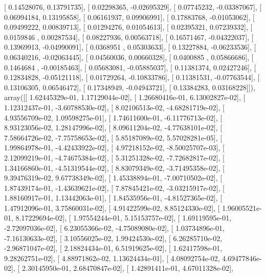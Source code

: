 \documentclass{article}
\begin{document}
       [ 0.14528076,  0.13791735],
       [ 0.02298365, -0.02695329],
       [ 0.07745232, -0.03387067],
       [ 0.06994184,  0.13195858],
       [ 0.06161937,  0.09906991],
       [ 0.17883768, -0.01053062],
       [ 0.09499222,  0.00839713],
       [ 0.01294276,  0.01054613],
       [ 0.02395321,  0.07239332],
       [ 0.0159846 ,  0.00287534],
       [ 0.08227936,  0.00563718],
       [ 0.16571467, -0.04322037],
       [ 0.13969913, -0.04990091],
       [ 0.0368951 ,  0.05303633],
       [ 0.13227884, -0.06233536],
       [ 0.06340216, -0.02063445],
       [ 0.04560036,  0.00660328],
       [ 0.0400885 ,  0.05866686],
       [ 0.1464684 , -0.00185463],
       [ 0.05683081, -0.05885037],
       [ 0.11381374,  0.02427246],
       [ 0.12834828, -0.05121118],
       [ 0.01729264, -0.10833786],
       [ 0.11381531, -0.07763544],
       [ 0.13106305,  0.06546472],
       [ 0.17348949, -0.04943721],
       [ 0.13384283,  0.03168228]]), array([[  1.62445329e-01,   1.17129044e-02],
       [  1.26680416e-01,   6.13002827e-02],
       [  1.12312437e-01,  -3.60788530e-02],
       [  8.02106513e-02,  -4.68281719e-02],
       [  4.93556709e-02,   1.09598275e-01],
       [  1.74611600e-01,  -6.11776713e-02],
       [  8.93123056e-02,   1.28147996e-02],
       [  8.09611204e-02,  -4.77638101e-02],
       [  7.58664726e-02,  -7.75758653e-02],
       [  5.85187089e-02,   5.57028281e-05],
       [  1.99864978e-01,  -4.42433922e-02],
       [  4.97218152e-02,  -8.50025707e-03],
       [  2.12099219e-01,  -4.74675384e-02],
       [  5.31251328e-02,  -7.72682817e-02],
       [  1.34166860e-01,  -4.51319544e-02],
       [  8.83079349e-02,  -3.71495358e-02],
       [  9.39476319e-02,   9.67738349e-02],
       [  1.45338894e-01,  -7.00710502e-02],
       [  1.87439174e-01,  -1.43639621e-02],
       [  7.87845421e-02,  -3.03215917e-02],
       [  1.88160917e-01,   1.13442063e-01],
       [  1.84535956e-01,  -4.81527365e-02],
       [  1.47912096e-01,   3.75860031e-02],
       [  4.91422599e-02,   8.85124330e-02],
       [  1.96005521e-01,   8.17229694e-02],
       [  1.97554244e-01,   5.15153757e-02],
       [  1.69119595e-01,  -2.72097036e-02],
       [  6.23055366e-02,  -4.75089080e-02],
       [  1.03734896e-01,  -7.16130633e-02],
       [  3.10556025e-02,   1.99424530e-02],
       [  6.26285710e-02,  -2.96871047e-02],
       [  2.18824434e-01,   6.51919625e-02],
       [  1.62417598e-01,   9.28262751e-02],
       [  4.88971862e-02,   1.13624434e-01],
       [  4.08092754e-02,   4.69477846e-02],
       [  2.30145950e-01,   2.68470847e-02],
       [  1.42891411e-01,   4.67011328e-02],
\end{document}
